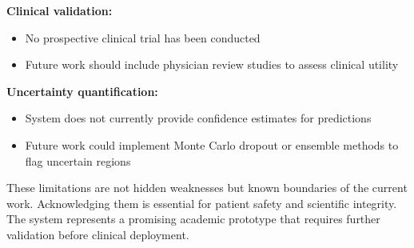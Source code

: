 \textbf{Clinical validation:}
\begin{itemize}
    \item No prospective clinical trial has been conducted
    \item Future work should include physician review studies to assess clinical utility
\end{itemize}

\textbf{Uncertainty quantification:}
\begin{itemize}
    \item System does not currently provide confidence estimates for predictions
    \item Future work could implement Monte Carlo dropout or ensemble methods to flag uncertain regions
\end{itemize}

These limitations are not hidden weaknesses but known boundaries of the current work. Acknowledging them is essential for patient safety and scientific integrity. The system represents a promising academic prototype that requires further validation before clinical deployment.
